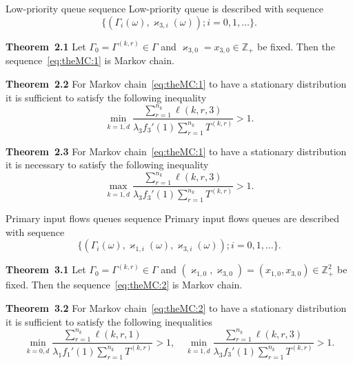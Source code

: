 \documentclass[10pt]{beamer}
\begin{document}
\begin{frame}[allowframebreaks]{Low-priority queue sequence}
Low-priority queue is described with sequence
\begin{equation}
\label{eq:theMC:1}
\{(\Gamma_i(\omega), \varkappa_{3,i}(\omega)); i =0, 1, \ldots\}.
\end{equation}
\vfill
\begin{block}{\bf Theorem~2.1}
Let $\Gamma_0=\Gamma^{(k,r)}\in \Gamma$ and $\varkappa_{3,0}=x_{3,0}\in \mathbb{Z}_+$ be fixed. Then the sequence~\eqref{eq:theMC:1} is Markov chain.
\end{block}

\begin{block}{\bf Theorem~2.2}
For Markov chain~\eqref{eq:theMC:1} to have a stationary distribution it is sufficient to satisfy the following inequality
\begin{equation*}
\min_{k=\overline{1,d}} { \frac{\sum_{r = 1}^{n_k} \ell(k,r,3) }{\lambda_3 f_3'(1) \sum_{r=1}^{n_k} T^{(k,r)} }}>1.
\label{sufficient:double}
\end{equation*}
\end{block}


\begin{block}{\bf Theorem~2.3}
For Markov chain~\eqref{eq:theMC:1} to have a stationary distribution it is necessary to satisfy the following inequality
$$
\max_{k=\overline{1,d}} { \frac{\sum_{r = 1}^{n_{k}}\ell(k,r,3)}{\lambda_3 f_3'(1) \sum_{r = 1}^{n_k} T^{(k,r)}} } >1.
$$
\end{block}
\end{frame}



\begin{frame}{Primary input flows queues sequence}
Primary input flows queues are described with sequence
\begin{equation}
\label{eq:theMC:2}
\{(\Gamma_i(\omega), \varkappa_{1,i}(\omega),\varkappa_{3,i}(\omega)); i =0, 1, \ldots\}.
\end{equation}
\vfill
\begin{block}{\bf Theorem~3.1}
 Let $\Gamma_0=\Gamma^{(k,r)}\in \Gamma$ and $(\varkappa_{1,0}, \varkappa_{3,0})=(x_{1,0}, x_{3,0})\in \mathbb{Z}_+^2$ be fixed. Then the sequence~\eqref{eq:theMC:2} is Markov chain.
\end{block}
\begin{block}{\bf Theorem~3.2}
For Markov chain~\eqref{eq:theMC:2} to have a stationary distribution it is sufficient to satisfy the following inequalities
\begin{equation*}
\min_{k=\overline{0,d}} { \frac{\sum_{r = 1}^{n_k} \ell(k,r,1) }{\lambda_1 f_1'(1) \sum_{r=1}^{n_k} T^{(k,r)} }}>1, \quad 
\min_{k=\overline{1,d}} { \frac{\sum_{r = 1}^{n_k} \ell(k,r,3) }{\lambda_3 f_3'(1) \sum_{r=1}^{n_k} T^{(k,r)} }}>1.
\label{sufficient:double}
\end{equation*}
\end{block}
\end{frame}
\end{document}

